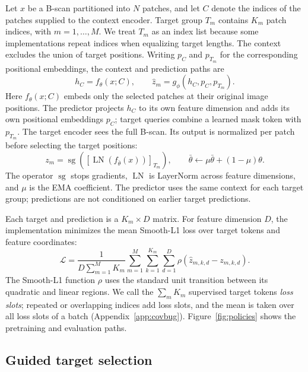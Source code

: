 \documentclass{article}
\begin{document}
Let $x$ be a B-scan partitioned into $N$ patches, and let $C$ denote the
indices of the patches supplied to the context encoder. Target group $T_m$
contains $K_m$ patch indices, with $m=1,\ldots,M$. We treat $T_m$ as an
index list because some implementations repeat indices when equalizing target
lengths. The context excludes the union of target positions.
Writing $p_C$ and $p_{T_m}$ for the corresponding positional embeddings,
the context and prediction paths are
\begin{equation}
 h_C=f_\theta(x;C), \qquad
 \widehat z_m=g_\phi(h_C,p_C,p_{T_m}).
 \label{eq:prediction}
\end{equation}
Here $f_\theta(x;C)$ embeds only the selected patches at their original image
positions. The predictor projects $h_C$ to its own feature dimension and
adds its own positional embeddings $p_C$; target queries combine a learned
mask token with $p_{T_m}$. The target encoder sees the full B-scan. Its output is normalized
per patch before selecting the target positions:
\begin{equation}
 z_m=\operatorname{sg}\!\left(
       [\operatorname{LN}(f_{\bar\theta}(x))]_{T_m}
      \right), \qquad
 \bar\theta\leftarrow \mu\bar\theta+(1-\mu)\theta .
 \label{eq:teacher}
\end{equation}
The operator $\operatorname{sg}$ stops gradients, $\operatorname{LN}$ is
LayerNorm across feature dimensions, and $\mu$ is the EMA coefficient.
The predictor uses the same context for each target group; predictions are
not conditioned on earlier target predictions.

Each target and prediction is a $K_m\times D$ matrix.
For feature dimension $D$, the implementation minimizes the mean Smooth-L1
loss over target tokens and feature coordinates:
\begin{equation}
 \mathcal L =
 \frac{1}{D\sum_{m=1}^{M}K_m}
 \sum_{m=1}^{M}\sum_{k=1}^{K_m}\sum_{d=1}^{D}
 \rho\!\left(\widehat z_{m,k,d}-z_{m,k,d}\right).
 \label{eq:loss}
\end{equation}
The Smooth-L1 function $\rho$ uses the standard unit transition between its
quadratic and linear regions. We call the $\sum_m K_m$ supervised target tokens
\emph{loss slots}; repeated or overlapping indices add loss slots, and the mean
is taken over all loss slots of a batch (Appendix~\ref{app:covbug}).
Figure~\ref{fig:policies} shows the pretraining and evaluation paths.

\subsection{Guided target selection}
\end{document}
